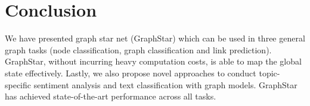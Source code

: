 \documentclass{article}
\begin{document}
\section{Conclusion}
We have presented graph star net (GraphStar) which can be used in three general graph tasks (node classification, graph classification and link prediction). GraphStar, without incurring heavy computation costs, is able to map the global state effectively. Lastly, we also propose novel approaches to conduct topic-specific sentiment analysis and text classification with graph models. GraphStar has achieved state-of-the-art performance across all tasks.




\newpage 


\end{document}
